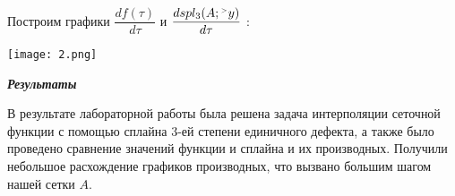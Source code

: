 \documentclass[12pt]{article}
\begin{document}
Построим графики $\dfrac {d f(\tau)} {d \tau}$ и $\dfrac {d spl_3(A; {}^{\mathsmaller{>}} y)} {d \tau}$ :
\begin{center}
	\texttt{[image: 2.png]}
\end{center}
\begin{center}
	\textbf{\textit{Результаты}}
\end{center}

В результате лабораторной работы была решена задача интерполяции сеточной функции с помощью сплайна 3-ей степени единичного дефекта, а также было проведено сравнение значений функции и сплайна и их производных. Получили небольшое расхождение графиков производных, что вызвано большим шагом нашей сетки $A$.
\end{document}
